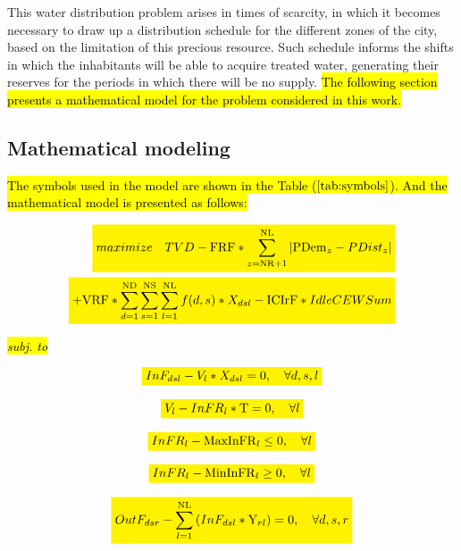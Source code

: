 \documentclass{singlecol}
\newcommand{\mathcolorbox}[2]{\colorbox{#1}{$\displaystyle #2$}}
\theoremstyle{TH}{
\newtheorem{lemma}{Lemma}
\newtheorem{theorem}[lemma]{Theorem}
\newtheorem{corrolary}[lemma]{Corrolary}
\newtheorem{conjecture}[lemma]{Conjecture}
\newtheorem{proposition}[lemma]{Proposition}
\newtheorem{claim}[lemma]{Claim}
\newtheorem{stheorem}[lemma]{Wrong Theorem}
\newtheorem{algorithm}{Algorithm}
}
\theoremstyle{THrm}{
\newtheorem{definition}{Definition}[section]
\newtheorem{question}{Question}[section]
\newtheorem{remark}{Remark}
\newtheorem{scheme}{Scheme}
}
\theoremstyle{THhit}{
\newtheorem{case}{Case}[section]
}
\begin{document}
This water distribution problem arises in times of scarcity, in which it becomes necessary to draw up a distribution schedule for the different zones of the city, based on the limitation of this precious resource. Such schedule informs the shifts in which the inhabitants will be able to acquire treated water, generating their reserves for the periods in which there will be no supply. \hl{The following section presents a mathematical model for the problem considered in this work. }

\subsection{Mathematical modeling}
\label{sec:problemModel}
 
\hl{The symbols used in the model are shown in the Table (}\mathcolorbox{yellow}{\ref{tab:symbols}}\hl{). And the mathematical model is presented as follows:}

\begin{eqnarray} 
\label{eq:objFunc}
	 \mathcolorbox{yellow}{maximize \quad TVD - \mathrm{FRF}*\sum_{z=\mathrm{NR}+1}^{\mathrm{NL}}{|\mathrm{PDem}_{z} - PDist_{z}|}} \\ \nonumber 
	\mathcolorbox{yellow}{+ \mathrm{VRF} * \sum_{d=1}^{\mathrm{ND}}{\sum_{s=1}^{\mathrm{NS}}{\sum_{l=1}^{\mathrm{NL}}{f(d,s)*X_{dsl}}}} - \mathrm{ICIrF}*IdleCEWSum}
\end{eqnarray}

\hl{\emph{subj. to}}

\begin{equation}
	\mathcolorbox{yellow}{InF_{dsl} - V_{l} * X_{dsl} = 0, \quad \forall{d, s, l}}
	\label{eq:evalInF}
\end{equation}

\begin{equation}
	\mathcolorbox{yellow}{V_l - {InFR}_l * \mathrm{T} = 0, \quad \forall{l}}
	\label{eq:evalnFR}
\end{equation}

\begin{equation}
	\mathcolorbox{yellow}{{InFR}_l - \mathrm{MaxInFR}_{l} \leq 0, \quad \forall{l}}
	\label{eq:evalMaxInfR}
\end{equation} 

\begin{equation}
	\mathcolorbox{yellow}{{InFR}_l - \mathrm{MinInFR}_{l} \geq 0, \quad \forall{l}}
	\label{eq:evalMinInfR}
\end{equation}

\begin{equation} 
	\mathcolorbox{yellow}{OutF_{dsr} - \sum_{l=1}^{\mathrm{NL}}{(InF_{dsl}*\mathrm{Y}_{rl})} = 0, \quad \forall{d, s, r}}
	 \label{eq:evalOutFRes}
\end{equation}
\end{document}
